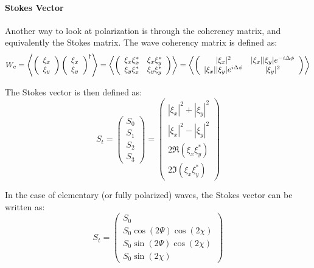 

\paragraph{ Stokes Vector }

Another way to look at polarization is through the coherency matrix, and equivalently the Stokes matrix.
The wave coherency matrix is defined as:
\begin{equation}
W_c = \left<
\left(
\begin{array}{c}
 \xi_x \\
 \xi_y
\end{array}
\right)
\left(
\begin{array}{c}
 \xi_x \\
 \xi_y
\end{array}
\right)^{\dagger}
\right>
= \left<
\left(
\begin{array}{c c}
 \xi_x \xi_x^* 	& \xi_x \xi_y^* \\
 \xi_y \xi_x^* 	& \xi_y \xi_y^* 
\end{array}
\right)
\right>
= \left<
\left(
\begin{array}{c c}
 |\xi_x|^2 	& |\xi_x| |\xi_y| e^{-i \Delta \phi} \\
 |\xi_x| |\xi_y| e^{i \Delta \phi} 	& |\xi_y|^2
\end{array}
\right)
\right>
\end{equation}

The Stokes vector is then defined as:
\begin{equation}
S_t = 
\left(
\begin{array}{c}
 S_0 \\
 S_1 \\
 S_2 \\
 S_3
\end{array}
\right)
=
\left(
\begin{array}{c}
 |\xi_x|^2 + |\xi_y|^2 \\
 |\xi_x|^2 - |\xi_y|^2 \\
 2\Re(\xi_x \xi_y^*) \\
 2\Im(\xi_x \xi_y^*)
\end{array}
\right)
\end{equation}

In the case of elementary (or fully polarized) waves, the Stokes vector can be written as:
\begin{equation}
S_t = 
\left(
\begin{array}{c}
 S_0 \\
 S_0 \cos(2\Psi) \cos(2\chi) \\
 S_0 \sin(2\Psi) \cos(2\chi) \\
 S_0 \sin(2\chi)
\end{array}
\right)
\end{equation}

